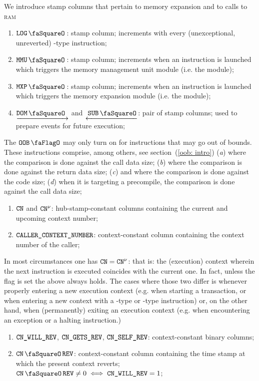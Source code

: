 We introduce stamp columns that pertain to memory expansion and to calls to \textsc{ram}
\begin{enumerate}[resume]
	\item $\logStamp$:
		stamp column; increments with every (unexceptional, unreverted) -type instruction; 
	\item $\mmuStamp$:
		stamp column; increments when an instruction is launched which triggers the memory management unit module (i.e. the \mmuMod{} module);
	\item $\mxpStamp$:
		stamp column; increments when an instruction is launched which triggers the memory expansion module (i.e. the \mxpMod{} module);
	\item $\domStamp$ and $\subStamp$:
		pair of stamp columns; used to prepare events for future execution; 
\end{enumerate}
The $\oobFlag$ may only turn on for instructions that may go out of bounds. These instructions comprise, among others, see section~(\ref{oob: intro})
(\emph{a})  where the comparison is done against the call data size;
(\emph{b})  where the comparison is done against the return data size;
(\emph{c})  and  where the comparison is done against the code size;
(\emph{d})  when it is targeting a precompile, the comparison is done against the call data size;
\begin{enumerate}[resume]
	\item $\texttt{CN}{}$ and $\texttt{CN}{}^{\nu}$:
		hub-stamp-constant columns containing the current and upcoming context number;
	\item $\texttt{CALLER\_CONTEXT\_NUMBER}{}$:
		context-constant column containing the context number of the caller;
\end{enumerate}
In most circumstances one has $\texttt{CN}{} = \texttt{CN}{}^{\nu}$: that is: the (execution) context wherein the next instruction is executed coincides with the current one. In fact, unless the \CONTEXTMAYCHANGE{} flag is set the above always holds. The cases where those two differ is whenever properly entering a new execution context (e.g. when starting a transaction, or when entering a new context with a -type or -type instruction) or, on the other hand, when (permanently) exiting an execution context (e.g. when encountering an exception or a halting instruction.) 
\begin{enumerate}[resume]
	\item $\texttt{CN}\texttt{\_WILL\_REV}$, $\texttt{CN}\texttt{\_GETS\_REV}$, $\texttt{CN}\texttt{\_SELF\_REV}$:
		context-constant binary columns;
	\item $\cnRevStamp$:
		context-constant column containing the time stamp at which the present context reverts; $\cnRevStamp \neq 0 \iff \cnWillRev = 1$;
\end{enumerate}
